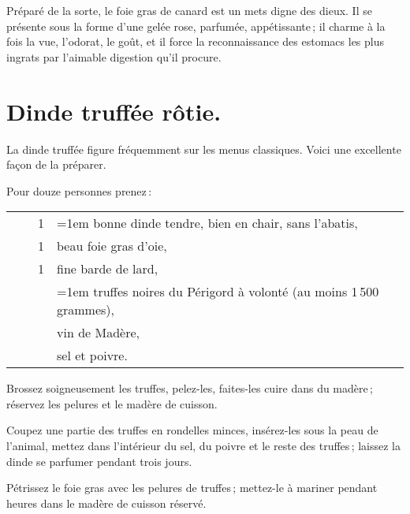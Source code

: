 Préparé de la sorte, le foie gras de canard est un mets digne des dieux. Il se
présente sous la forme d'une gelée rose, parfumée, appétissante ; il charme à la
fois la vue, l'odorat, le goût, et il force la reconnaissance des estomacs les plus
ingrats par l’aimable digestion qu'il procure.

\section*{\centering Dinde truffée rôtie.}
{}

La dinde truffée figure fréquemment sur les menus classiques. Voici une
excellente façon de la préparer.

\medskip

Pour douze personnes prenez :

\footnotesize
\begin{longtable}{rrrp{20em}}
        &         &  1 & \hangindent=1em bonne dinde tendre, bien en chair, sans l'abatis,                \\
        &         &  1 & beau foie gras d'oie,                                                            \\
        &         &  1 & fine barde de lard,                                                              \\
        &         &    & \hangindent=1em truffes noires du Périgord à volonté (au moins 1 500 grammes),   \\
        &         &    & vin de Madère,                                                                   \\
        &         &    & sel et poivre.                                                                   \\
\end{longtable}
\normalsize

Brossez soigneusement les truffes, pelez-les, faites-les cuire dans du madère ;
réservez les pelures et le madère de cuisson.

Coupez une partie des truffes en rondelles minces, insérez-les sous la peau de
l'animal, mettez dans l'intérieur du sel, du poivre et le reste des truffes ;
laissez la dinde se parfumer pendant trois jours.

Pétrissez le foie gras avec les pelures de truffes ; mettez-le à mariner
pendant {\mmm} heures dans le madère de cuisson réservé.

